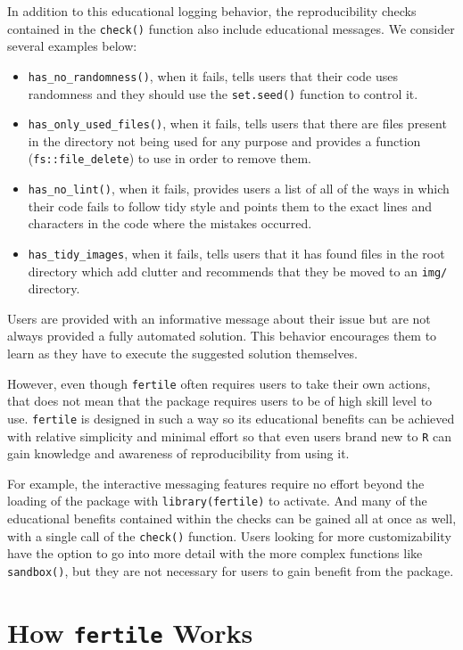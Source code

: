\documentclass[12pt,twoside]{reedthesis}
\begin{document}
In addition to this educational logging behavior, the reproducibility checks contained in the \texttt{check()} function also include educational messages. We consider several examples below:
\begin{itemize}
\item
  \texttt{has\_no\_randomness()}, when it fails, tells users that their code uses randomness and they should use the \texttt{set.seed()} function to control it.
\item
  \texttt{has\_only\_used\_files()}, when it fails, tells users that there are files present in the directory not being used for any purpose and provides a function (\texttt{fs::file\_delete}) to use in order to remove them.
\item
  \texttt{has\_no\_lint()}, when it fails, provides users a list of all of the ways in which their code fails to follow tidy style and points them to the exact lines and characters in the code where the mistakes occurred.
\item
  \texttt{has\_tidy\_images}, when it fails, tells users that it has found files in the root directory which add clutter and recommends that they be moved to an \texttt{img/} directory.
\end{itemize}
Users are provided with an informative message about their issue but are not always provided a fully automated solution. This behavior encourages them to learn as they have to execute the suggested solution themselves.

However, even though \texttt{fertile} often requires users to take their own actions, that does not mean that the package requires users to be of high skill level to use. \texttt{fertile} is designed in such a way so its educational benefits can be achieved with relative simplicity and minimal effort so that even users brand new to \texttt{R} can gain knowledge and awareness of reproducibility from using it.

For example, the interactive messaging features require no effort beyond the loading of the package with \texttt{library(fertile)} to activate. And many of the educational benefits contained within the checks can be gained all at once as well, with a single call of the \texttt{check()} function. Users looking for more customizability have the option to go into more detail with the more complex functions like \texttt{sandbox()}, but they are not necessary for users to gain benefit from the package.

\hypertarget{how-fertile-works}{%
\section{\texorpdfstring{How \texttt{fertile} Works}{How fertile Works}}\label{how-fertile-works}}
\end{document}
